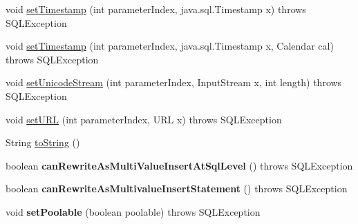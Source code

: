 \begin{DoxyCompactItemize}
\item 
void \mbox{\hyperlink{classcom_1_1mysql_1_1jdbc_1_1_server_prepared_statement_a252954de3d685bbc24d5822f98793e37}{set\+Timestamp}} (int parameter\+Index, java.\+sql.\+Timestamp x)  throws S\+Q\+L\+Exception 
\item 
void \mbox{\hyperlink{classcom_1_1mysql_1_1jdbc_1_1_server_prepared_statement_af767678f3827282895f28e7009c1c524}{set\+Timestamp}} (int parameter\+Index, java.\+sql.\+Timestamp x, Calendar cal)  throws S\+Q\+L\+Exception 
\item 
void \mbox{\hyperlink{classcom_1_1mysql_1_1jdbc_1_1_server_prepared_statement_a366c36761206d2104213b5aeaaaeb2b9}{set\+Unicode\+Stream}} (int parameter\+Index, Input\+Stream x, int length)  throws S\+Q\+L\+Exception 
\item 
void \mbox{\hyperlink{classcom_1_1mysql_1_1jdbc_1_1_server_prepared_statement_aa1b307d5296eda6944ce2526ba8cea37}{set\+U\+RL}} (int parameter\+Index, U\+RL x)  throws S\+Q\+L\+Exception 
\item 
String \mbox{\hyperlink{classcom_1_1mysql_1_1jdbc_1_1_server_prepared_statement_adbcd3a8f7f7d1d7408d97df3f1318a3d}{to\+String}} ()
\item 
\mbox{\label{classcom_1_1mysql_1_1jdbc_1_1_server_prepared_statement_add47395a86aa5d4e93334da998283fd0}} 
boolean {\bfseries can\+Rewrite\+As\+Multi\+Value\+Insert\+At\+Sql\+Level} ()  throws S\+Q\+L\+Exception 
\item 
\mbox{\label{classcom_1_1mysql_1_1jdbc_1_1_server_prepared_statement_aa5e63ab355750d3845b2d4213bcdda70}} 
boolean {\bfseries can\+Rewrite\+As\+Multivalue\+Insert\+Statement} ()  throws S\+Q\+L\+Exception 
\item 
\mbox{\label{classcom_1_1mysql_1_1jdbc_1_1_server_prepared_statement_abaaaa3786947d352e5fed30c87dd4670}} 
void {\bfseries set\+Poolable} (boolean poolable)  throws S\+Q\+L\+Exception 
\end{DoxyCompactItemize}
